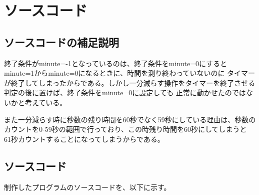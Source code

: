 \documentclass[a4paper,titlepage,11pt]{ltjsarticle}
\begin{document}
\section{ソースコード}
\subsection{ソースコードの補足説明}
終了条件がminute=-1となっているのは、終了条件をminute=0にするとminute=1からminute=0になるときに、時間を測り終わっていないのに
タイマーが終了してしまったからである。しかし一分減らす操作をタイマーを終了させる判定の後に置けば、終了条件をminute=0に設定しても
正常に動かせたのではないかと考えている。

また一分減らす時に秒数の残り時間を60秒でなく59秒にしている理由は、秒数のカウントを0-59秒の範囲で行っており、この時残り時間を60秒にしてしまうと
61秒カウントすることになってしまうからである。
\subsection{ソースコード}
制作したプログラムのソースコードを、以下に示す。

\end{document}
